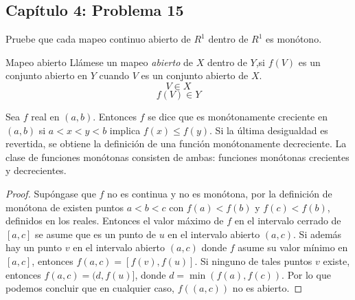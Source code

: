 \subsection{Capítulo 4: Problema 15}
 Pruebe que cada mapeo continuo abierto de $R^1$ dentro de $R^1$ es monótono. 
\begin{noter}{Mapeo abierto}
Llámese un mapeo \textit{abierto} de $X$ dentro de $Y$,si $f(V)$ es un conjunto abierto en $Y$ cuando $V$ es un conjunto abierto de $X$.
$$V\in X$$
$$f(V)\in Y$$
\end{noter}

\begin{tcolorbox}[colback=blue!15,colframe=blue!1!blue,title=Definición 4.28 de monótono de \cite{rudin1976principles}]
Sea $f$ real en $(a, b)$. Entonces $f$ se dice que es monótonamente creciente en $(a, b)$ si $a<x<y<b$ implica $f(x) \leq f(y)$. Si la última desigualdad es revertida, se obtiene la definición de una función monótonamente decreciente. La clase de funciones monótonas consisten de ambas: funciones monótonas crecientes y decrecientes.
\end{tcolorbox}


\begin{proof}
 Supóngase que $f$ no es continua y no es monótona, por la definición de monótona de \cite{rudin1976principles} existen puntos $a<b<c$ con $f(a)<f(b)$ y $f(c)<f(b)$, definidos en los reales. Entonces el valor máximo de $f$ en el intervalo cerrado de $[a, c]$ se asume que es un punto de $u$ en el intervalo abierto $(a, c)$. Si además hay un punto $v$ en el intervalo abierto $(a, c)$ donde $f$ asume su valor mínimo en $[a, c]$, entonces $f(a, c)=[f(v), f(u)]$. Si ninguno de tales puntos $v$ existe,
entonces $f(a, c)=(d, f(u)]$, donde $d=\min (f(a), f(c)) .$ Por lo que podemos concluir que en cualquier caso, $f((a, c))$ no es abierto.
\end{proof}